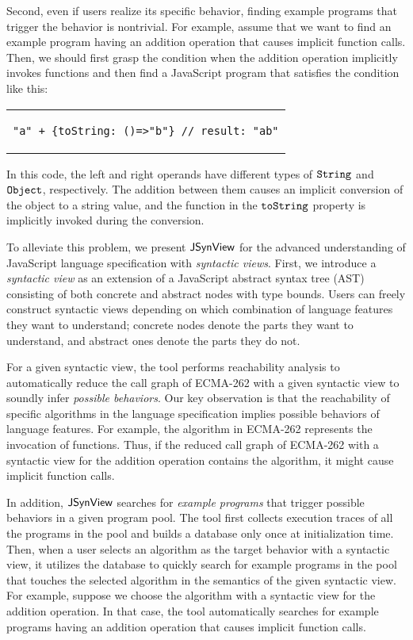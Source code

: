 Second, even if users realize its specific behavior, finding example programs
that trigger the behavior is nontrivial.  For example, assume that we want to
find an example program having an addition operation that causes implicit
function calls.  Then, we should first grasp the condition when the addition
operation implicitly invokes functions and then find a JavaScript program that
satisfies the condition like this:
\begin{center}
  \begin{tabular}{c}
    \begin{lstlisting}[style=JS]
"a" + {toString: ()=>"b"} // result: "ab"
    \end{lstlisting}
  \end{tabular}
\end{center}
In this code, the left and right operands have different types of $\code{String}$
and $\code{Object}$, respectively.  The addition between them causes an
implicit conversion of the object to a string value, and the function in the
$\code{toString}$ property is implicitly invoked during the conversion.

To alleviate this problem, we present $\tool$ for the advanced understanding of
JavaScript language specification with \textit{syntactic views}.  First, we
introduce a \textit{syntactic view} as an extension of a JavaScript
abstract syntax tree (AST) consisting of both concrete and abstract nodes with
type bounds.  Users can freely construct syntactic views depending on
which combination of language features they want to understand; concrete nodes
denote the parts they want to understand, and abstract ones denote the parts
they do not.

For a given syntactic view, the tool performs reachability analysis to
automatically reduce the call graph of ECMA-262 with a given syntactic view to
soundly infer \textit{possible behaviors}.  Our key observation is that the
reachability of specific algorithms in the language specification implies
possible behaviors of language features.  For example, the 
algorithm in ECMA-262 represents the invocation of functions.  Thus, if the
reduced call graph of ECMA-262 with a syntactic view for the addition operation
contains the  algorithm, it might cause implicit function calls.

In addition, $\tool$ searches for \textit{example programs} that trigger
possible behaviors in a given program pool. The tool first collects execution
traces of all the programs in the pool and builds a database only once at
initialization time. Then, when a user selects an algorithm as the target
behavior with a syntactic view, it utilizes the database to quickly search for
example programs in the pool that touches the selected algorithm in the
semantics of the given syntactic view. For example, suppose we choose the
 algorithm with a syntactic view for the addition operation. In that
case, the tool automatically searches for example programs having an addition
operation that causes implicit function calls.

